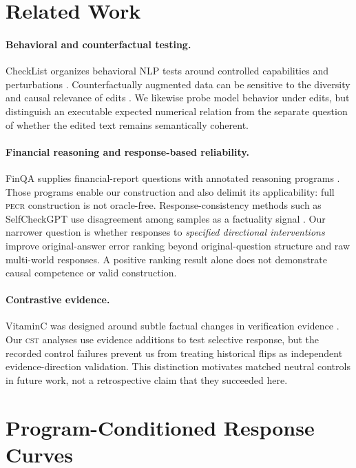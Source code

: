 \documentclass[11pt]{article}
\newcommand{\PECR}{\textsc{pecr}}
\newcommand{\CST}{\textsc{cst}}
\begin{document}
\section{Related Work}
\paragraph{Behavioral and counterfactual testing.}
CheckList organizes behavioral NLP tests around controlled capabilities and perturbations \citep{ribeiro-etal-2020-beyond}. Counterfactually augmented data can be sensitive to the diversity and causal relevance of edits \citep{joshi-he-2022-investigation}. We likewise probe model behavior under edits, but distinguish an executable expected numerical relation from the separate question of whether the edited text remains semantically coherent.

\paragraph{Financial reasoning and response-based reliability.}
FinQA supplies financial-report questions with annotated reasoning programs \citep{chen-etal-2021-finqa}. Those programs enable our construction and also delimit its applicability: full \PECR{} construction is not oracle-free. Response-consistency methods such as SelfCheckGPT use disagreement among samples as a factuality signal \citep{manakul-etal-2023-selfcheckgpt}. Our narrower question is whether responses to \emph{specified directional interventions} improve original-answer error ranking beyond original-question structure and raw multi-world responses. A positive ranking result alone does not demonstrate causal competence or valid construction.

\paragraph{Contrastive evidence.}
VitaminC was designed around subtle factual changes in verification evidence \citep{schuster-etal-2021-get}. Our \CST{} analyses use evidence additions to test selective response, but the recorded control failures prevent us from treating historical flips as independent evidence-direction validation. This distinction motivates matched neutral controls in future work, not a retrospective claim that they succeeded here.

\section{Program-Conditioned Response Curves}
\end{document}
